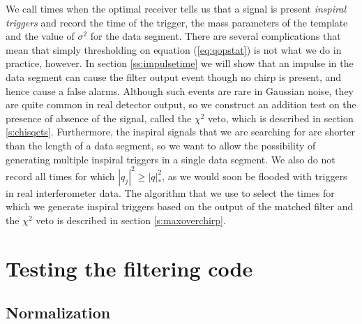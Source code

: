 We call times when the optimal receiver tells us that a signal is
present \emph{inspiral triggers} and record the time of the trigger,
the mass parameters of the template and the value of $\sigma^2$ for the data
segment. There are several complications that mean that simply thresholding on
equation (\ref{eq:qopstat}) is not what we do in practice, however. In section
\ref{ss:impulsetime} we will show that an impulse in the data segment can
cause the filter output event though no chirp is present, and hence cause a
false alarms. Although such events are rare in Gaussian noise, they are quite
common in real detector output, so we construct an addition test on the
presence of absence of the signal, called the $\chi^2$ veto\cite{Allen:2004},
which is described in section \ref{s:chisqcts}. Furthermore, the inspiral
signals that we are searching for are shorter than the length of
a data segment, so we want to allow the possibility of generating multiple
inspiral triggers in a single data segment. We also do not record all
times for which $|q_j|^2 \ge |q|^2_\ast$, as we would soon be flooded with
triggers in real interferometer data. The algorithm that we use to select the
times for which we generate inspiral triggers based on the output of the
matched filter and the $\chi^2$ veto is described in section
\ref{s:maxoverchirp}.

\section{Testing the filtering code}
\label{s:testing}

\subsection{Normalization}
\label{ss:normalization}



